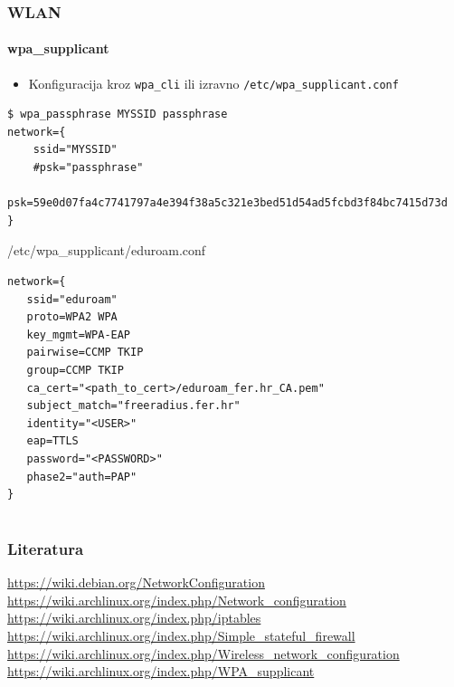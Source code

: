 \documentclass[t,table,usenames,dvipsnames]{beamer}
\begin{document}
\begin{frame}[fragile]
	\frametitle{WLAN}
	\framesubtitle{wpa\_supplicant}
	\begin{itemize}
		\item Konfiguracija kroz \texttt{wpa\_cli} ili izravno \texttt{/etc/wpa\_supplicant.conf}
	\end{itemize}
	{\tiny \begin{verbatim}
$ wpa_passphrase MYSSID passphrase
network={
    ssid="MYSSID"
    #psk="passphrase"
    psk=59e0d07fa4c7741797a4e394f38a5c321e3bed51d54ad5fcbd3f84bc7415d73d
}
	\end{verbatim}
	\begin{block}{/etc/wpa\_supplicant/eduroam.conf}
	\begin{verbatim}
network={
   ssid="eduroam"
   proto=WPA2 WPA
   key_mgmt=WPA-EAP
   pairwise=CCMP TKIP
   group=CCMP TKIP
   ca_cert="<path_to_cert>/eduroam_fer.hr_CA.pem"
   subject_match="freeradius.fer.hr"
   identity="<USER>"
   eap=TTLS
   password="<PASSWORD>"
   phase2="auth=PAP"
}
	\end{verbatim}
	\end{block}}
\end{frame}

\section*{}
\begin{frame}
	\frametitle{Literatura}
	\footnotesize
	\url{https://wiki.debian.org/NetworkConfiguration}\\
	\url{https://wiki.archlinux.org/index.php/Network_configuration}
	\vfill
	\url{https://wiki.archlinux.org/index.php/iptables}\\
	\url{https://wiki.archlinux.org/index.php/Simple_stateful_firewall}
	\vfill
	\url{https://wiki.archlinux.org/index.php/Wireless_network_configuration}\\
	\url{https://wiki.archlinux.org/index.php/WPA_supplicant}
	\vfill
\end{frame}
\end{document}

